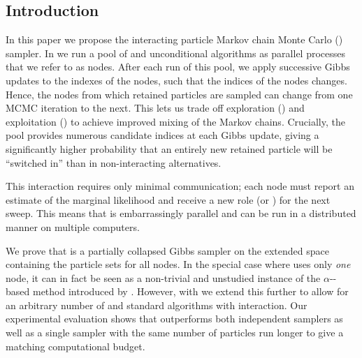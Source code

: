 
\subsection{Introduction}
\label{sec:ipmcmc:intro}



In this paper we propose the interacting particle Markov chain Monte Carlo (\ipmcmc) sampler. In \ipmcmc we run a pool of \csmc and unconditional \smc algorithms as parallel processes that we refer to as nodes. After each run of this pool, we apply successive Gibbs updates to the indexes of the \csmc nodes, such that the indices of the \csmc nodes changes. Hence, the nodes from which retained particles are sampled can change from one MCMC iteration to the next. This lets us trade off exploration (\smc) and exploitation (\csmc) to achieve improved mixing of the Markov chains. Crucially, the pool provides numerous candidate indices at each Gibbs update, giving a significantly higher probability that an entirely new retained particle will be ``switched in'' than in non-interacting alternatives.

This interaction requires only minimal communication; each node must report an estimate of the marginal likelihood and receive a new role (\smc or \csmc) for the next sweep. This means that \ipmcmc is embarrassingly parallel and can be run in a distributed manner on multiple computers.


We prove that \ipmcmc is a partially collapsed Gibbs sampler on the extended space containing the particle sets for all nodes. In the special case where \ipmcmc uses only \emph{one} \csmc node, it can in fact be seen as a non-trivial and unstudied instance of the $\alpha$-\smc-based \citep{whiteley2016} \pmcmc method introduced by \citet{huggins2015}. However, with \ipmcmc we extend this further to allow for an arbitrary number of \csmc and standard \smc algorithms with interaction. Our experimental evaluation shows that \ipmcmc outperforms both independent \pg samplers as well as a single \pg sampler with the same number of particles run longer to give a matching computational budget.

